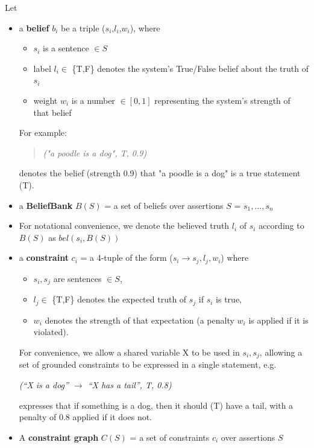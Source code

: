 \documentclass[11pt]{article}
\newcommand{\red}[1]{\textcolor{red}{#1}}
\newenvironment{myquote}{                   %
  \parskip 0mm \begin{quoting}[vskip=0mm,leftmargin=2mm]}{
\end{quoting}}
\newenvironment{ite}{                     %
     \parskip 0cm \begin{itemize} \parskip 0cm \parsep 0cm \itemsep 0cm \topsep 0cm}{
        \end{itemize}} %
\begin{document}
\noindent Let
\vspace{-2mm}
\begin{ite}
  \item a {\bf belief} $b_i$ be a triple ($s_i$,$l_i$,$w_i$), where 
     \begin{ite}
     \item $s_i$ is a sentence $\in S$ %
      \item label $l_i \in$ \{T,F\} denotes the system's True/False belief about the truth of $s_i$
     \item weight $w_i$ is a number $\in [0,1]$ representing the system's strength of that belief
    \end{ite}
 For example:
 \begin{quote}
{\it      ("a poodle is a dog", T, 0.9) }
 \end{quote} 
 denotes the belief (strength 0.9) that "a poodle is a dog" is a true statement (T).
  \item a {\bf BeliefBank} $B(S)$ = a set of beliefs over assertions $S$ = $s_1,...,s_n$
 \item For notational convenience, we denote the believed truth $l_i$ of $s_i$ according to $B(S)$ as $bel(s_i,B(S))$
 \item a {\bf constraint} $c_i$ = a 4-tuple of the form 
($s_i \rightarrow s_j, l_j, w_i$)
where 
\begin{ite}
\item $s_i,s_j$ are sentences $\in S$, 
\item $l_j \in$ \{T,F\} denotes the expected truth of $s_j$ if $s_i$ is true,
\item $w_i$ denotes the strength of that expectation (a penalty $w_i$ is applied if it is violated). 
\end{ite}
For convenience, we allow a shared variable X to be used in $s_i,s_j$, allowing a set of grounded
constraints to be expressed in a single statement, e.g.
\begin{myquote}
{\it (``X is a dog'' $\rightarrow$ ``X has a tail'', T, 0.8) }
\end{myquote}
expresses that if something is a dog, then it should (T) have a tail, with a penalty of 0.8 applied if
it does not.
\item A {\bf constraint graph} $C(S)$ = a set of constraints $c_i$ over assertions $S$ 
\end{ite}
\end{document}
